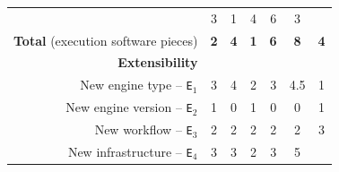 \documentclass[preprint,3p,twocolumn]{elsarticle}
\begin{document}
\begin{table}
\begin{tabular}{rcccccc}
                                     & \cellcolor[HTML]{99E399}3
                                     & \cellcolor[HTML]{99FF99}1
                                     & \cellcolor[HTML]{99D699}4
                                     & \cellcolor[HTML]{99BB99}6
                                     & \cellcolor[HTML]{99E399}3\\
  \textbf{Total} (execution software pieces)& \cellcolor[HTML]{99F599}\textbf{2}
                                     & \cellcolor[HTML]{99E199}\textbf{4}
                                     & \cellcolor[HTML]{99FF99}\textbf{1}
                                     & \cellcolor[HTML]{99CE99}\textbf{6}
                                     & \cellcolor[HTML]{99BB99}\textbf{8}
                                     & \cellcolor[HTML]{99E199}\textbf{4}\\
\cellcolor[HTML]{EEEEEE}\textbf{Extensibility}& \multicolumn{6}{l}{\cellcolor[HTML]{EEEEEE}}\\
  New engine type -- \texttt{E$_1$}  & \cellcolor[HTML]{99D899}3
                                     & \cellcolor[HTML]{99C499}4
                                     & \cellcolor[HTML]{99EB99}2
                                     & \cellcolor[HTML]{99D899}3
                                     & \cellcolor[HTML]{99BB99}4.5
                                     & \cellcolor[HTML]{99FF99}1\\
New engine version -- \texttt{E$_2$} & \cellcolor[HTML]{99BB99}1
                                     & \cellcolor[HTML]{99FF99}0
                                     & \cellcolor[HTML]{99BB99}1
                                     & \cellcolor[HTML]{99FF99}0
                                     & \cellcolor[HTML]{99FF99}0
                                     & \cellcolor[HTML]{99BB99}1\\
  New workflow -- \texttt{E$_3$} & \cellcolor[HTML]{99FF99}2
                                     & \cellcolor[HTML]{99FF99}2
                                     & \cellcolor[HTML]{99FF99}2
                                     & \cellcolor[HTML]{99FF99}2
                                     & \cellcolor[HTML]{99FF99}2
                                     & \cellcolor[HTML]{99BB99}3\\
New infrastructure -- \texttt{E$_4$} & \cellcolor[HTML]{99E899}3
                                     & \cellcolor[HTML]{99E899}3
                                     & \cellcolor[HTML]{99FF99}2
                                     & \cellcolor[HTML]{99E899}3
                                     & \cellcolor[HTML]{99BB99}5

\end{tabular}
\end{table}
\end{document}
